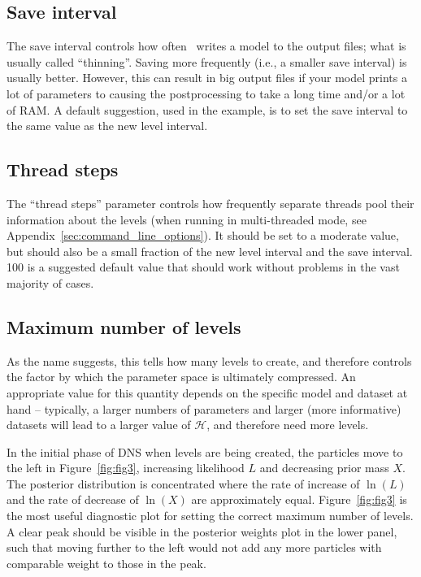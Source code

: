 \documentclass[article]{jss}
\newcommand{\dnest}{\pkg{DNest4}}
\begin{document}
\subsection{Save interval}
The save interval controls how often \dnest~writes a model to the output
files; what is usually called ``thinning''. Saving more frequently
(i.e., a smaller save interval) is usually better. However, this can result
in
big output files if your model prints a lot of parameters to 
causing the postprocessing to take a long time and/or a lot of RAM.
A default suggestion, used in the example, is to set the save interval to the
same value as the new level interval.

\subsection{Thread steps}
The ``thread steps'' parameter controls how frequently separate threads pool
their information about the levels (when running in multi-threaded mode,
see Appendix~\ref{sec:command_line_options}). It should be set to a moderate
value, but should also be a small fraction of the new level interval and the
save interval. 100 is a suggested default value that should work without
problems in the vast majority of cases.

\subsection{Maximum number of levels}
As the name suggests, this tells  how many levels to create, and
therefore controls the factor by which the parameter space is ultimately
compressed. An appropriate value for this quantity depends on the specific
model and dataset at hand -- typically, a larger numbers of parameters
and larger (more informative) datasets will lead to a larger value of
$\mathcal{H}$, and therefore need more levels.

In the initial phase of DNS when levels are being created, the particles
move to the left in Figure~\ref{fig:fig3}, increasing likelihood $L$ and
decreasing prior mass $X$. The posterior distribution is concentrated
where the rate of increase of $\ln(L)$ and the rate of decrease of
$\ln(X)$ are approximately equal.
Figure~\ref{fig:fig3} is the most useful diagnostic
plot for setting the correct
maximum number of levels. A clear peak should be visible in the posterior
weights plot in the lower panel, such that moving further to the left would not
add any more particles with comparable weight to those in the peak.
\end{document}
